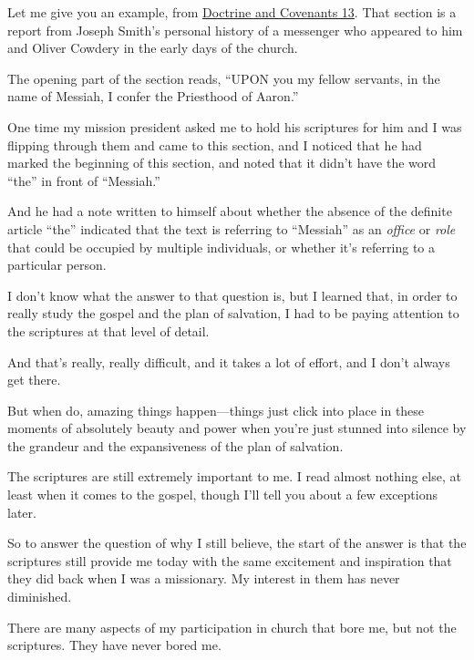 \begin{compactitem}
\begin{compactitem}
\begin{compactitem}
							\item Let me give you an example, from \hyperref[DC13-1]{Doctrine and Covenants 13}. That section is a report from Joseph Smith's personal history of a messenger who appeared to him and Oliver Cowdery in the early days of the church.
							\item The opening part of the section reads, ``UPON you my fellow servants, in the name of Messiah, I confer the Priesthood of Aaron.''
							\item One time my mission president asked me to hold his scriptures for him and I was flipping through them and came to this section, and I noticed that he had marked the beginning of this section, and noted that it didn't have the word ``the'' in front of ``Messiah.'' 
							\item And he had a note written to himself about whether the absence of the definite article ``the'' indicated that the text is referring to ``Messiah'' as an \textit{office} or \textit{role} that could be occupied by multiple individuals, or whether it's referring to a particular person.
							\item I don't know what the answer to that question is, but I learned that, in order to really study the gospel and the plan of salvation, I had to be paying attention to the scriptures at that level of detail.
							\item And that's really, really difficult, and it takes a lot of effort, and I don't always get there.
							\item But when do, amazing things happen---things just click into place in these moments of absolutely beauty and power when you're just stunned into silence by the grandeur and the expansiveness of the plan of salvation.
						\end{compactitem}
					\item The scriptures are still extremely important to me. I read almost nothing else, at least when it comes to the gospel, though I'll tell you about a few exceptions later.
					\item So to answer the question of why I still believe, the start of the answer is that the scriptures still provide me today with the same excitement and inspiration that they did back when I was a missionary. My interest in them has never diminished.
						\begin{compactitem}
							\item There are many aspects of my participation in church that bore me, but not the scriptures. They have never bored me.
						\end{compactitem}
				\end{compactitem}
				

\end{compactitem}
